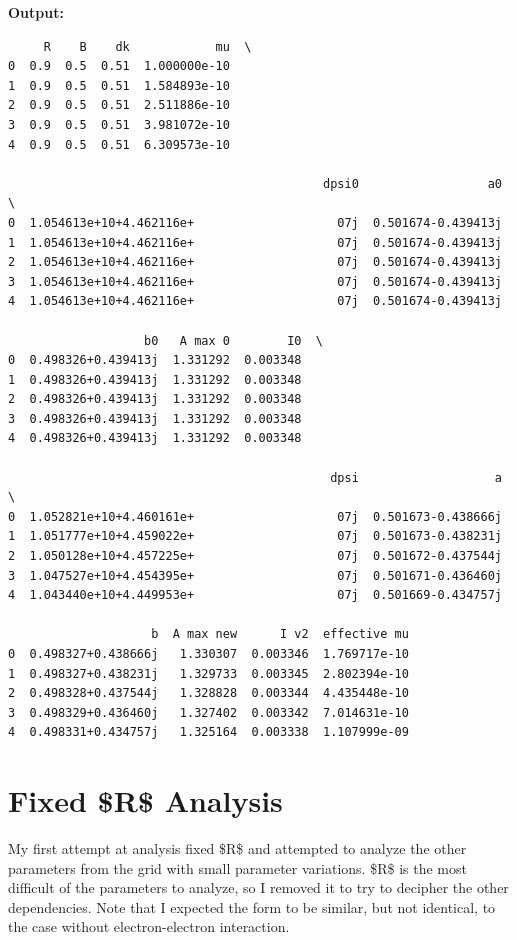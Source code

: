 \documentclass{article}
\begin{document}
\textbf{Output:}\begin{verbatim}
     R    B    dk            mu  \
0  0.9  0.5  0.51  1.000000e-10   
1  0.9  0.5  0.51  1.584893e-10   
2  0.9  0.5  0.51  2.511886e-10   
3  0.9  0.5  0.51  3.981072e-10   
4  0.9  0.5  0.51  6.309573e-10   

                                            dpsi0                  a0  \
0  1.054613e+10+4.462116e+                    07j  0.501674-0.439413j   
1  1.054613e+10+4.462116e+                    07j  0.501674-0.439413j   
2  1.054613e+10+4.462116e+                    07j  0.501674-0.439413j   
3  1.054613e+10+4.462116e+                    07j  0.501674-0.439413j   
4  1.054613e+10+4.462116e+                    07j  0.501674-0.439413j   

                   b0   A max 0        I0  \
0  0.498326+0.439413j  1.331292  0.003348   
1  0.498326+0.439413j  1.331292  0.003348   
2  0.498326+0.439413j  1.331292  0.003348   
3  0.498326+0.439413j  1.331292  0.003348   
4  0.498326+0.439413j  1.331292  0.003348   

                                             dpsi                   a  \
0  1.052821e+10+4.460161e+                    07j  0.501673-0.438666j   
1  1.051777e+10+4.459022e+                    07j  0.501673-0.438231j   
2  1.050128e+10+4.457225e+                    07j  0.501672-0.437544j   
3  1.047527e+10+4.454395e+                    07j  0.501671-0.436460j   
4  1.043440e+10+4.449953e+                    07j  0.501669-0.434757j   

                    b  A max new      I v2  effective mu  
0  0.498327+0.438666j   1.330307  0.003346  1.769717e-10  
1  0.498327+0.438231j   1.329733  0.003345  2.802394e-10  
2  0.498328+0.437544j   1.328828  0.003344  4.435448e-10  
3  0.498329+0.436460j   1.327402  0.003342  7.014631e-10  
4  0.498331+0.434757j   1.325164  0.003338  1.107999e-09  
\end{verbatim}

\section{Fixed \$R\$ Analysis}

My first attempt at analysis fixed \$R\$ and attempted to analyze the other parameters from the grid with small parameter variations. \$R\$ is the most difficult of the parameters to analyze, so I removed it to try to decipher the other dependencies. Note that I expected the form to be similar, but not identical, to the case without electron-electron interaction.
\end{document}
